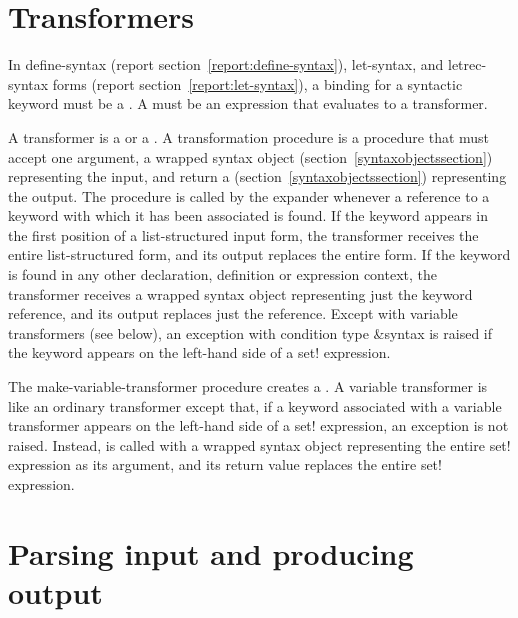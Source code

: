 \section{Transformers}
\label{transformerssection}

In {\cf define-syntax} (report section~\ref{report:define-syntax}), {\cf
  let-syntax}, and {\cf letrec-syntax} forms
(report section~\ref{report:let-syntax}), a binding for a syntactic keyword must be
a .  A  must be an
expression that evaluates to a transformer.

A transformer is a  or a
.
A transformation procedure is a procedure that must accept one
argument, a wrapped syntax object (section~\ref{syntaxobjectssection})
representing the input, and return a 
(section~\ref{syntaxobjectssection}) representing the output.
The procedure is called by the expander whenever a reference to
a keyword with which it has been associated is found.
If the keyword appears in the first position of a list-structured
input form, the transformer receives the entire list-structured
form, and its output replaces the entire form.
If the keyword is found in any other declaration, definition or expression
context, the transformer receives a wrapped syntax object representing
just the keyword reference, and its output replaces just the reference.
Except with variable transformers (see below), an exception with condition
type {\cf\&syntax} is raised if the keyword appears on the left-hand side
of a {\cf set!} expression.

\begin{entry}{%
}


The {\cf make-variable-transformer} procedure creates a
.
A variable transformer is like an ordinary transformer except
that, if a keyword associated with a variable transformer appears on
the left-hand side of a {\cf set!} expression, an exception is
not raised.
Instead,  is called with a
wrapped syntax object representing the entire {\cf set!} expression as
its argument, and its return value replaces the entire {\cf set!}
expression.
\end{entry}

\section{Parsing input and producing output}
\label{syntaxcasesection}

